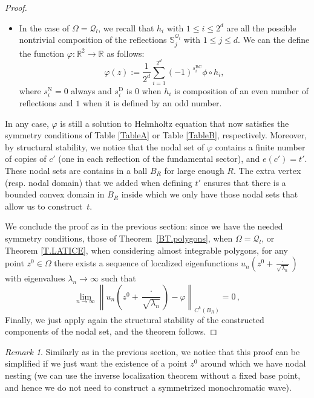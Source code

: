 \documentclass{amsart}
\theoremstyle{definition}
\theoremstyle{remark}
\newtheorem{remark}[theorem]{Remark}
\newcommand{\la}{\lambda}
\renewcommand\leq\leqslant
\numberwithin{equation}{section}
\theoremstyle{definition}
\theoremstyle{remark}
\begin{document}
\begin{proof}
\begin{itemize}
	 	\item In the case of $\Omega=\mathcal{Q}_l$, we recall that $h_i$ with $1\leq i\leq 2^d$ are all the possible nontrivial composition of the reflections $\mathbb{S}_j^{\mathcal{Q}_l}$ with $1\leq j\leq d$. We can the define the function $\varphi:\mathbb{R}^2\rightarrow\mathbb{R}$ as follows: 
	 	\begin{equation}
	 		\varphi(z):=\frac{1}{2^d}\sum_{i=1}^{2^d}\left(-1\right)^{s_i^{\mathrm{BC}}}\phi\circ h_i,
	 	\end{equation}where $s_i^{\mathrm{N}}=0$ always and $s_i^{\mathrm{D}}$ is $0$ when $h_i$ is composition of an even number of reflections and $1$ when it is defined by an odd number. 
	 \end{itemize}
	   In any case, ${\varphi}$ is still a solution to Helmholtz equation that now satisfies the symmetry conditions of Table \ref{TableA} or Table \ref{TableB}, respectively. Moreover, by structural stability, we notice that the nodal set of $\varphi$ contains a finite number of copies of $c'$ (one in each reflection of the fundamental sector), and $e(c')=t'$. These nodal sets are contains in a ball $B_R$ for large enough $R$. The extra vertex (resp. nodal domain) that we added when defining $t'$ ensures that there is a bounded convex domain in $B_R$ inside which we only have those nodal sets that allow us to construct~$t$. 
	   
	   We conclude the proof as in the previous section:  since we have the needed symmetry conditions, 
	   those of Theorem~\ref{BT.polygons}, when $\Omega=\mathcal{Q}_l$, or Theorem \ref{T.LATICE}, when considering almost integrable polygons, for any point $z^0\in\Omega$ there exists a sequence of localized eigenfunctions $u_n\left(z^0+\frac{\cdot}{\sqrt{\la_n}}\right)$ with eigenvalues $\la_n\to\infty$ such that
	   \begin{equation}
	   	\lim_{n\to\infty}\left\|u_n\left(z^0+\frac{\cdot}{\sqrt{\la_n}}\right)-\varphi\right\|_{C^{k}(B_R)}=0\,,
	   \end{equation}
	   Finally, we just apply again the structural stability of the constructed components of the nodal set, and the theorem follows. 
	   
\end{proof} 
\begin{remark}
    Similarly as in the previous section, we notice that this proof can be simplified if we just want the existence of a point $z^0$ around which we have nodal nesting (we can use the inverse localization theorem without a fixed base point, and hence we do not need to construct a symmetrized monochromatic wave).
    
\end{remark}
\end{document}

